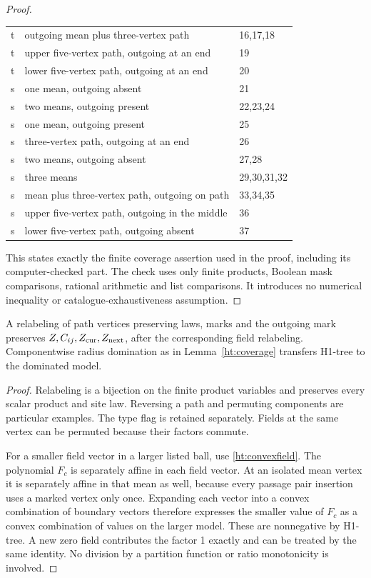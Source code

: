 \begin{proof}
\begin{center}
\begin{tabular}{cll}
 t & outgoing mean plus three-vertex path & 16,17,18\\
 t & upper five-vertex path, outgoing at an end & 19\\
 t & lower five-vertex path, outgoing at an end & 20\\
 s & one mean, outgoing absent & 21\\
 s & two means, outgoing present & 22,23,24\\
 s & one mean, outgoing present & 25\\
 s & three-vertex path, outgoing at an end & 26\\
 s & two means, outgoing absent & 27,28\\
 s & three means & 29,30,31,32\\
 s & mean plus three-vertex path, outgoing on path & 33,34,35\\
 s & upper five-vertex path, outgoing in the middle & 36\\
 s & lower five-vertex path, outgoing absent & 37\\\bottomrule
\end{tabular}
\end{center}
This states exactly the finite coverage assertion used in the proof,
including its computer-checked part. The check uses only finite products,
Boolean mask comparisons, rational arithmetic and list comparisons.
It introduces no numerical inequality or catalogue-exhaustiveness
assumption.
\end{proof}

\begin{htlem}\label{ht:extension}
A relabeling of path vertices preserving laws, marks and the outgoing
mark preserves \(Z,C_{ij},Z_{\rm cur},Z_{\rm next}\), after the corresponding
field relabeling. Componentwise radius domination as in
Lemma~\ref{ht:coverage} transfers H1-tree to the dominated model.
\end{htlem}
\begin{proof}
Relabeling is a bijection on the finite product variables and preserves
every scalar product and site law. Reversing a path and permuting
components are particular examples. The type flag is retained
separately. Fields at the same vertex can be permuted because their
factors commute.

For a smaller field vector in a larger listed ball, use
\eqref{ht:convexfield}. The polynomial \(F_c\) is separately affine
in each field vector. At an isolated mean vertex it is separately
affine in that mean as well, because every passage pair insertion
uses a marked vertex only once. Expanding each vector into a convex
combination of boundary vectors therefore expresses the smaller value
of \(F_c\) as a convex combination of values on the larger model.
These are nonnegative by H1-tree. A new zero field contributes the
factor 1 exactly and can be treated by the same identity. No division
by a partition function or ratio monotonicity is involved.
\end{proof}

